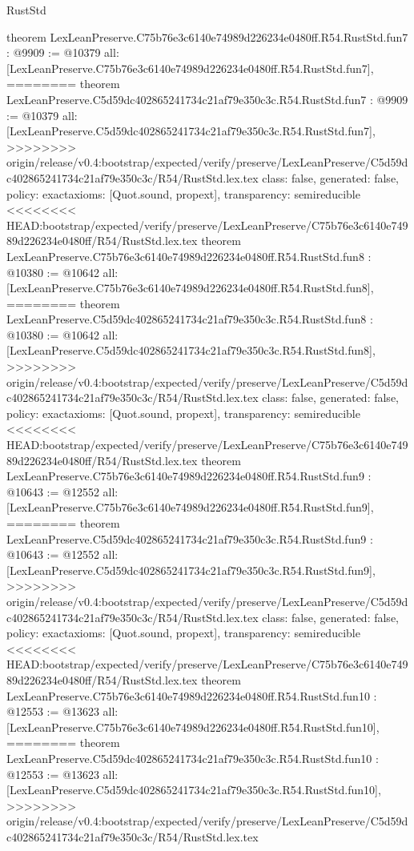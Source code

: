 \begin{lexlean}{RustStd}
\begin{coremodule}
{\begin{coremodule}
{{{{{{{{{theorem LexLeanPreserve.C75b76e3c6140e74989d226234e0480ff.R54.RustStd.fun7 : @9909 := @10379 {
  all: [LexLeanPreserve.C75b76e3c6140e74989d226234e0480ff.R54.RustStd.fun7],
========
theorem LexLeanPreserve.C5d59dc402865241734c21af79e350c3c.R54.RustStd.fun7 : @9909 := @10379 {
  all: [LexLeanPreserve.C5d59dc402865241734c21af79e350c3c.R54.RustStd.fun7],
>>>>>>>> origin/release/v0.4:bootstrap/expected/verify/preserve/LexLeanPreserve/C5d59dc402865241734c21af79e350c3c/R54/RustStd.lex.tex
  class: false,
  generated: false,
  policy: exact{axioms: [Quot.sound, propext]},
  transparency: semireducible
}
<<<<<<<< HEAD:bootstrap/expected/verify/preserve/LexLeanPreserve/C75b76e3c6140e74989d226234e0480ff/R54/RustStd.lex.tex
theorem LexLeanPreserve.C75b76e3c6140e74989d226234e0480ff.R54.RustStd.fun8 : @10380 := @10642 {
  all: [LexLeanPreserve.C75b76e3c6140e74989d226234e0480ff.R54.RustStd.fun8],
========
theorem LexLeanPreserve.C5d59dc402865241734c21af79e350c3c.R54.RustStd.fun8 : @10380 := @10642 {
  all: [LexLeanPreserve.C5d59dc402865241734c21af79e350c3c.R54.RustStd.fun8],
>>>>>>>> origin/release/v0.4:bootstrap/expected/verify/preserve/LexLeanPreserve/C5d59dc402865241734c21af79e350c3c/R54/RustStd.lex.tex
  class: false,
  generated: false,
  policy: exact{axioms: [Quot.sound, propext]},
  transparency: semireducible
}
<<<<<<<< HEAD:bootstrap/expected/verify/preserve/LexLeanPreserve/C75b76e3c6140e74989d226234e0480ff/R54/RustStd.lex.tex
theorem LexLeanPreserve.C75b76e3c6140e74989d226234e0480ff.R54.RustStd.fun9 : @10643 := @12552 {
  all: [LexLeanPreserve.C75b76e3c6140e74989d226234e0480ff.R54.RustStd.fun9],
========
theorem LexLeanPreserve.C5d59dc402865241734c21af79e350c3c.R54.RustStd.fun9 : @10643 := @12552 {
  all: [LexLeanPreserve.C5d59dc402865241734c21af79e350c3c.R54.RustStd.fun9],
>>>>>>>> origin/release/v0.4:bootstrap/expected/verify/preserve/LexLeanPreserve/C5d59dc402865241734c21af79e350c3c/R54/RustStd.lex.tex
  class: false,
  generated: false,
  policy: exact{axioms: [Quot.sound, propext]},
  transparency: semireducible
}
<<<<<<<< HEAD:bootstrap/expected/verify/preserve/LexLeanPreserve/C75b76e3c6140e74989d226234e0480ff/R54/RustStd.lex.tex
theorem LexLeanPreserve.C75b76e3c6140e74989d226234e0480ff.R54.RustStd.fun10 : @12553 := @13623 {
  all: [LexLeanPreserve.C75b76e3c6140e74989d226234e0480ff.R54.RustStd.fun10],
========
theorem LexLeanPreserve.C5d59dc402865241734c21af79e350c3c.R54.RustStd.fun10 : @12553 := @13623 {
  all: [LexLeanPreserve.C5d59dc402865241734c21af79e350c3c.R54.RustStd.fun10],
>>>>>>>> origin/release/v0.4:bootstrap/expected/verify/preserve/LexLeanPreserve/C5d59dc402865241734c21af79e350c3c/R54/RustStd.lex.tex
}}}}}}}}}}}}}}
\end{coremodule}}
\end{coremodule}
\end{lexlean}
